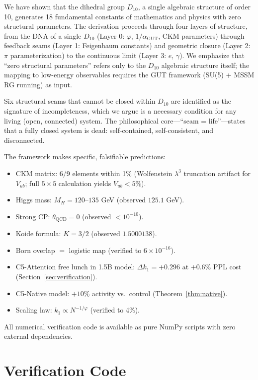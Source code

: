 \documentclass[11pt,a4paper]{article}
\begin{document}
We have shown that the dihedral group $D_{10}$, a single algebraic structure of order 10, generates 18 fundamental constants of mathematics and physics with zero structural parameters. The derivation proceeds through four layers of structure, from the DNA of a single $D_{10}$ (Layer 0: $\varphi$, $1/\alpha_{\text{GUT}}$, CKM parameters) through feedback seams (Layer 1: Feigenbaum constants) and geometric closure (Layer 2: $\pi$ parameterization) to the continuous limit (Layer 3: $e$, $\gamma$). We emphasize that ``zero structural parameters'' refers only to the $D_{10}$ algebraic structure itself; the mapping to low-energy observables requires the GUT framework (SU(5) + MSSM RG running) as input.

Six structural seams that cannot be closed within $D_{10}$ are identified as the signature of incompleteness, which we argue is a necessary condition for any living (open, connected) system. The philosophical core---``seam = life''---states that a fully closed system is dead: self-contained, self-consistent, and disconnected.

The framework makes specific, falsifiable predictions:
\begin{itemize}
\item CKM matrix: 6/9 elements within 1\% (Wolfenstein $\lambda^3$ truncation artifact for $V_{ub}$; full $5\times 5$ calculation yields $V_{ub} < 5\%$).
\item Higgs mass: $M_H = 120$--$135$ GeV (observed $125.1$ GeV).
\item Strong CP: $\theta_{\text{QCD}} = 0$ (observed $< 10^{-10}$).
\item Koide formula: $K = 3/2$ (observed $1.5000138$).
\item Born overlap $=$ logistic map (verified to $6 \times 10^{-16}$).
\item C5-Attention free lunch in 1.5B model: $\Delta k_1 = +0.296$ at $+0.6\%$ PPL cost (Section~\ref{sec:verification}).
\item C5-Native model: $+10\%$ activity vs.\ control (Theorem~\ref{thm:native}).
\item Scaling law: $k_1 \propto N^{-1/\varphi}$ (verified to 4\%).
\end{itemize}

All numerical verification code is available as pure NumPy scripts with zero external dependencies.

\appendix
\section{Verification Code}
\label{sec:code}
\end{document}
